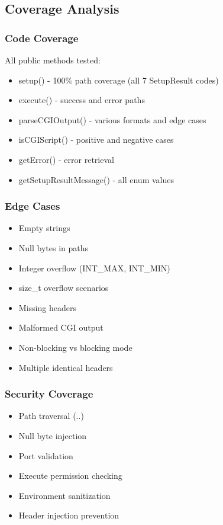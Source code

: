 \documentclass[11pt,a4paper]{article}
\begin{document}
\subsection{Coverage Analysis}

\subsubsection{Code Coverage}

All public methods tested:
\begin{itemize}
    \item setup() - 100\% path coverage (all 7 SetupResult codes)
    \item execute() - success and error paths
    \item parseCGIOutput() - various formats and edge cases
    \item isCGIScript() - positive and negative cases
    \item getError() - error retrieval
    \item getSetupResultMessage() - all enum values
\end{itemize}

\subsubsection{Edge Cases}

\begin{itemize}
    \item Empty strings
    \item Null bytes in paths
    \item Integer overflow (INT\_MAX, INT\_MIN)
    \item size\_t overflow scenarios
    \item Missing headers
    \item Malformed CGI output
    \item Non-blocking vs blocking mode
    \item Multiple identical headers
\end{itemize}

\subsubsection{Security Coverage}

\begin{itemize}
    \item Path traversal (..)
    \item Null byte injection
    \item Port validation
    \item Execute permission checking
    \item Environment sanitization
    \item Header injection prevention
\end{itemize}
\end{document}
